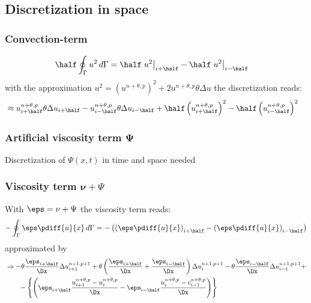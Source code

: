 \subsection{Discretization in space}
\subsubsection*{Convection-term}
\begin{align}
   \half \oint_\Gamma u^2\, d\Gamma & =
   \half \left. u^2\right|_{i+\half}
   - \half \left. u^2\right|_{i-\half}
\end{align}
with the approximation  $u^2 = (u^{n+\theta, p})^2
+ 2 u^{n+\theta, p} \theta \Delta u$ the discretization reads:
\begin{align}
    & \approx
    u^{n+\theta, p}_{i+\half} \theta \Delta u_{i+\half}
     - u^{n+\theta, p}_{i-\half} \theta \Delta u_{i-\half}
    + \half \left(u^{n+\theta, p}_{i+\half}\right)^2
    - \half \left(u^{n+\theta, p}_{i-\half}\right)^2
\end{align}
\subsubsection*{Artificial viscosity term $\bm \Psi$}
Discretization of $\Psi(x,t)$ in time and space needed

\notyet
\subsubsection*{Viscosity term $\bm \nu + \Psi$}
With $\eps = \nu + \Psi$ the viscosity term reads:
\begin{align}
     - \oint_\Gamma  \eps \pdiff{u}{x} \, d\Gamma =
     - \left(
     \left(\eps \pdiff{u}{x}\right)_{i+\half}
     - \left(\eps \pdiff{u}{x}\right)_{i-\half}
     \right)
\end{align}
approximated by
\begin{align}
     & \Rightarrow
    -\theta \frac{\eps_{i+\half}}{\Dx} \Delta u^{n+1, p+1}_{i+1}
    + \theta \left( \frac{\eps_{i+\half}}{\Dx}
    + \frac{\eps_{i-\half}}{\Dx} \right) \Delta u^{n+1, p+1}_{i}
    - \theta \frac{\eps_{i-\half}}{\Dx} \Delta u^{n+1, p+1}_{i-1}
    +
    \\*
    &\qquad -\left\{ \left( \eps_{i+\half} \frac{u^{n+\theta,p}_{i+1} - u^{n+\theta,p}_{i}}{\Dx} - \eps_{i-\half} \frac{u^{n+\theta,p}_{i} - c^{n+\theta,p}_{i-1}}{\Dx}\right) \right\}
\end{align}
